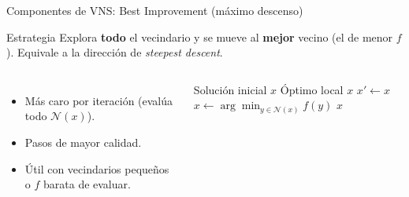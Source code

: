 \documentclass[aspectratio=169, 11pt, xcolor={dvipsnames,table}]{beamer}
\begin{document}
\begin{frame}{Componentes de VNS: Best Improvement (máximo descenso)}
\begin{block}{Estrategia}
Explora \textbf{todo} el vecindario y se mueve al \textbf{mejor} vecino (el de
menor $f$). Equivale a la dirección de \textit{steepest descent}.
\end{block}

\begin{columns}[T]
\begin{itemize}
  \item Más caro por iteración (evalúa todo $\mathcal{N}(x)$).
  \item Pasos de mayor calidad.
  \item Útil con vecindarios pequeños o $f$ barata de evaluar.
\end{itemize}

\scriptsize
\begin{algorithm}[H]
\caption{Best Improvement}
\begin{algorithmic}[1]
\Require Solución inicial $x$
\Ensure Óptimo local $x$
\Repeat
  \State $x' \gets x$
  \State $x \gets \arg\min_{y \in \mathcal{N}(x)} f(y)$
\Return $x$
\end{algorithmic}
\end{algorithm}
\end{columns}
\end{frame}



\end{document}

